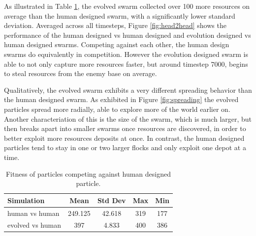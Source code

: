 \documentclass[letter]{article}
\begin{document}
As illustrated in Table \ref{table:meanfitness}, the evolved swarm collected over 100 more resources on average than the human designed swarm, with a significantly lower standard deviation. Averaged across all timesteps, Figure \ref{fig:head2head} shows the performance of the human designed vs human designed and evolution designed vs human designed swarms. Competing against each other, the human design swarms do equivalently in competition. However the evolution designed swarm is able to not only capture more resources faster, but around timestep 7000, begins to steal resources from the enemy base on average. 

Qualitatively, the evolved swarm exhibits a very different spreading behavior than the human designed swarm. As exhibited in Figure \ref{fig:spreading} the evolved particles spread more radially, able to explore more of the world earlier on. Another characteriation of this is the size of the swarm, which is much larger, but then breaks apart into smaller swarms once resources are discovered, in order to better exploit more resources deposits at once. In contrast, the human designed particles tend to stay in one or two larger flocks and only exploit one depot at a time.

\begin{table}
    \renewcommand{\arraystretch}{1.5}
    \centering
    \begin{tabular}{l | c c cc}
        \hline
        Simulation & Mean & Std Dev & Max & Min \\
        \hline
        human vs human & 249.125 & 42.618 & 319 & 177 \\
        evolved vs human & 397 & 4.833 & 400 & 386 \\
        \hline
    \end{tabular}
    \caption{Fitness of particles competing against human designed particle.}
    \label{table:meanfitness}
\end{table}
\end{document}

